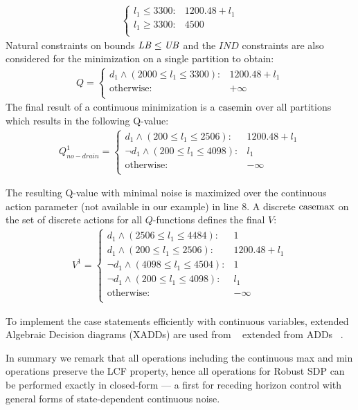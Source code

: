 \begin{itemize}
{\begin{align}
\begin{cases}
 l_1\leq  3300 :&  1200.48 + l_1 \\
  l_1\geq  3300 :&  4500 \\
\end{cases} \nonumber
\end{align}
}
Natural constraints on bounds $\mathit{LB} \leq \mathit{UB}$ and the $IND$ constraints are also considered for the minimization on a single partition to obtain: 
{\footnotesize
\begin{align}
Q =  
\begin{cases}
d_1 \land ( 2000 \leq l_1 \leq 3300 ):&  1200.48 + l_1 \\
\text{otherwise} :&  + \infty \\ 
\end{cases} \nonumber
\end{align}
}
The final result of a continuous minimization is a $\mathrm{casemin}$ over all partitions which results in the following Q-value:
{\footnotesize
\begin{align}
Q^1_{\mathit{no}-\mathit{drain}} =  
\begin{cases}
d_1 \land (200 \leq l_1 \leq 2506) : & 1200.48 + l_1 \\
\neg d_1 \land (200 \leq l_1 \leq 4098) : & l_1 \\
\text{otherwise} : & -\infty \\ 
\end{cases} \nonumber
\end{align}
}

The resulting Q-value with minimal noise is maximized over the continuous action parameter (not available in our example) in line 8. A discrete $\mathrm{casemax}$ on the set of discrete actions for all $Q$-functions defines the final $V$:
{\footnotesize
\begin{align}
V^1 =  
\begin{cases}
d_1 \land (2506 \leq l_1 \leq 4484): & 1 \\
d_1 \land (200 \leq l_1 \leq 2506): & 1200.48 + l_1 \\
\neg d_1 \land (4098 \leq l_1 \leq 4504) : & 1 \\
\neg d_1 \land (200 \leq l_1 \leq 4098) : & l_1 \\
\text{otherwise} : & -\infty \\ 
\end{cases} \nonumber
\end{align}
}
\end{itemize}
To implement the case statements efficiently with continuous
variables, extended Algebraic Decision diagrams (XADDs) are used from
~\cite{sanner_uai11} extended from ADDs
~\cite{bahar93add}. 

In summary we remark that all operations including the
continuous max and min operations preserve the LCF property,
hence all operations for Robust SDP can be performed exactly in
closed-form --- a first for receding horizon control with general forms
of state-dependent continuous noise.

